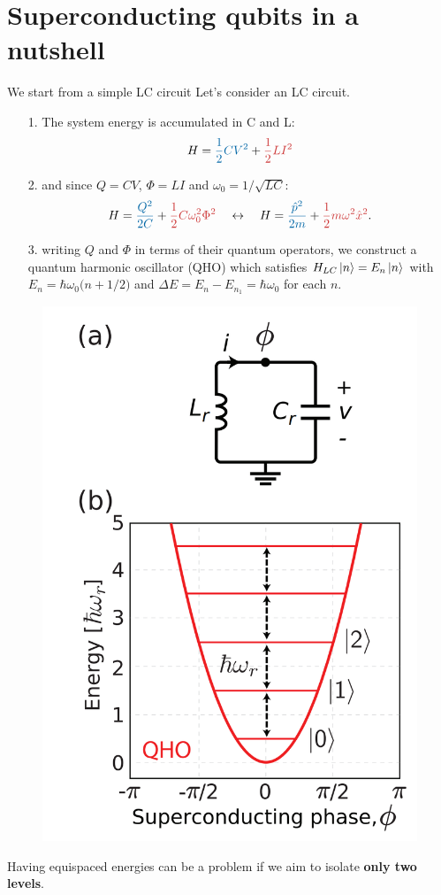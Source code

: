 \documentclass[aspectratio=169, 8pt, xcolor={svgnames}, hyperref={linkcolor=black}]{beamer}
\begin{document}
\section{Superconducting qubits in a nutshell}
\begin{frame}{We start from a simple LC circuit}
Let's consider an LC circuit.
\begin{multicols}{2}
\begin{itemize}[noitemsep]
\item[1.] The system energy is accumulated in \textcolor{mediumpersianblue}{C} and \textcolor{persianred}{L}:
$$ H = \textcolor{mediumpersianblue}{\frac{1}{2}CV^2} + \textcolor{persianred}{\frac{1}{2}LI^2} $$
\item[2.] and since $Q=CV$, $\Phi=LI$ and $\omega_0=1/\sqrt{LC}$: 
$$ H = \textcolor{mediumpersianblue}{\frac{Q^2}{2C}} + \textcolor{persianred}{\frac{1}{2}C\omega_0^2\Phi^2} \quad \leftrightarrow \quad H = \textcolor{mediumpersianblue}{\frac{\hat{p}^2}{2m}} + \textcolor{persianred}{\frac{1}{2}m\omega^2\hat{x}^2}. $$
\item[3.] writing $Q$ and $\Phi$ in terms of their quantum operators, we construct a 
quantum harmonic oscillator (QHO) which satisfies $H_{LC}\ket{n}=E_n\ket{n}$ with 
$E_n = \hbar \omega_0 \bigl( n + 1/2 \bigr)$ and 
$\Delta E = E_{n} - E_{n_1} = \hbar \omega_0$ for each $n$.
\end{itemize}
\begin{figure}
   \includegraphics[width=0.6\linewidth]{figures/lc.png}
\end{figure} 
\end{multicols}
Having equispaced energies can be a problem if we aim to isolate \textbf{only two levels}.
\end{frame}
\end{document}
